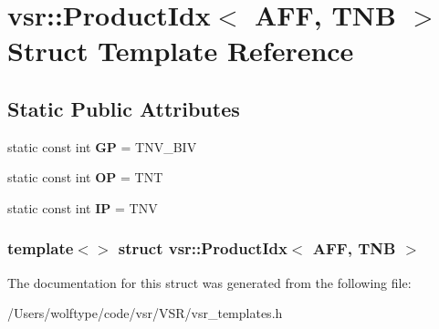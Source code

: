 \hypertarget{structvsr_1_1_product_idx_3_01_a_f_f_00_01_t_n_b_01_4}{\section{vsr\-:\-:Product\-Idx$<$ A\-F\-F, T\-N\-B $>$ Struct Template Reference}
\label{structvsr_1_1_product_idx_3_01_a_f_f_00_01_t_n_b_01_4}
}
\subsection*{Static Public Attributes}
\begin{DoxyCompactItemize}
\item 
\hypertarget{structvsr_1_1_product_idx_3_01_a_f_f_00_01_t_n_b_01_4_a0fbddea3ebee7ed2bce54c765d5d34fe}{static const int {\bfseries G\-P} = T\-N\-V\-\_\-\-B\-I\-V}\label{structvsr_1_1_product_idx_3_01_a_f_f_00_01_t_n_b_01_4_a0fbddea3ebee7ed2bce54c765d5d34fe}

\item 
\hypertarget{structvsr_1_1_product_idx_3_01_a_f_f_00_01_t_n_b_01_4_a18d5bfd6bb42086c3d32d6568018d20c}{static const int {\bfseries O\-P} = T\-N\-T}\label{structvsr_1_1_product_idx_3_01_a_f_f_00_01_t_n_b_01_4_a18d5bfd6bb42086c3d32d6568018d20c}

\item 
\hypertarget{structvsr_1_1_product_idx_3_01_a_f_f_00_01_t_n_b_01_4_a919db7fc7f719cd230acf1fb9e00b082}{static const int {\bfseries I\-P} = T\-N\-V}\label{structvsr_1_1_product_idx_3_01_a_f_f_00_01_t_n_b_01_4_a919db7fc7f719cd230acf1fb9e00b082}

\end{DoxyCompactItemize}
\subsubsection*{template$<$$>$ struct vsr\-::\-Product\-Idx$<$ A\-F\-F, T\-N\-B $>$}



The documentation for this struct was generated from the following file\-:\begin{DoxyCompactItemize}
\item 
/\-Users/wolftype/code/vsr/\-V\-S\-R/vsr\-\_\-templates.\-h\end{DoxyCompactItemize}
